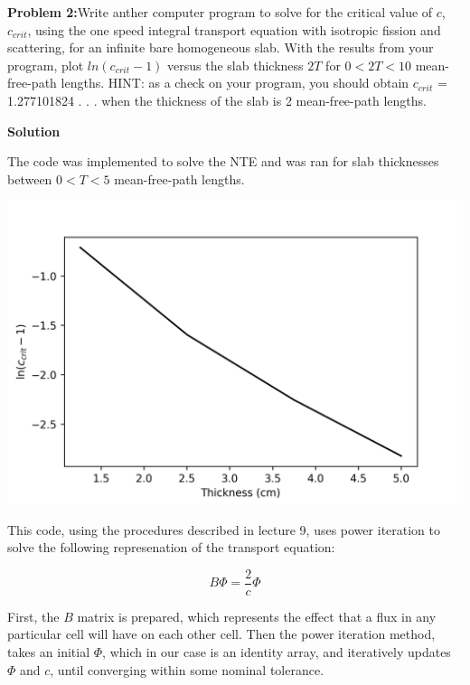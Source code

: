 \documentclass{amsart}
\theoremstyle{definition}
\begin{document}
 
\newpage
\textbf{Problem 2:}Write anther computer program to solve for the critical value of $c$, $c_{crit}$, using the one speed integral transport equation with isotropic fission and scattering, for an infinite bare homogeneous slab. With the results from your program, plot $ln (c_{crit} - 1)$ versus the slab thickness $2T$ for $0<2T<10$ mean-free-path lengths. HINT: as a check on your program, you should obtain $c_{crit}$ = 1.277101824 . . . when the thickness of the slab is 2 mean-free-path lengths.
\bigbreak
 
\textbf{Solution}

The code was implemented to solve the NTE and was ran for slab thicknesses between $0<T<5$ mean-free-path lengths.

\begin{center}
\includegraphics[totalheight=.40\textheight]{c_crit.png}
\end{center}

This code, using the procedures described in lecture 9, uses power iteration to solve the following represenation of the transport equation:

$$ B \Phi = \frac{2}{c} \Phi $$

First, the $B$ matrix is prepared, which represents the effect that a flux in any particular cell will have on each other cell.
Then the power iteration method, takes an initial $\Phi$, which in our case is an identity array, and iteratively updates $\Phi$ and $c$, until converging within some nominal tolerance.
 
\end{document}
